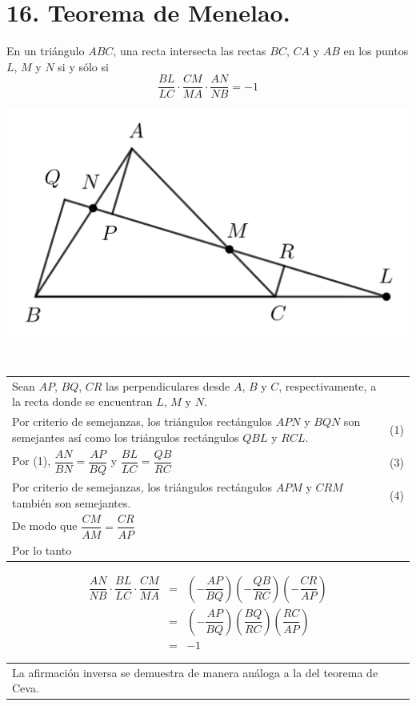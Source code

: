 \documentclass[12pt,a4paper, oneside]{book}
\begin{document}
\section{16. Teorema de Menelao.}
En un triángulo $ABC$, una recta intersecta las rectas $BC$, $CA$ y $AB$ en los puntos $L$, $M$ y $N$ si y sólo si
$$\dfrac{BL}{LC}\cdot\dfrac{CM}{MA}\cdot\dfrac{AN}{NB}=-1$$
\begin{center}
\includegraphics[scale=0.7]{Imagenes/Menelao1.png} 
\end{center}
\\
\begin{tabular}{p{15.9 cm} p{1cm}}
Sean $AP$, $BQ$, $CR$ las perpendiculares desde $A$, $B$ y $C$, respectivamente, a la recta donde se encuentran $L$, $M$ y $N$.
\\Por criterio de semejanzas, los triángulos rectángulos $APN$ y $BQN$ son semejantes así como los triángulos rectángulos $QBL$ y $RCL$. &(1)
\\Por (1), $\dfrac{AN}{BN}=\dfrac{AP}{BQ}$ y $\dfrac{BL}{LC}=\dfrac{QB}{RC}$ &(3)
\\Por criterio de semejanzas, los triángulos rectángulos $APM$ y $CRM$ también son semejantes.&(4)
\\ De modo que $\dfrac{CM}{AM}=\dfrac{CR}{AP}$
\\Por lo tanto
\end{tabular}
\begin{eqnarray*}
\dfrac{AN}{NB}\cdot \dfrac{BL}{LC}\cdot \dfrac{CM}{MA} &=& \left( - \dfrac{AP}{BQ}\right)  \left( -  \dfrac{QB}{RC} \right) \left( - \dfrac{CR}{AP}\right)
\\&=& \left(- \dfrac{AP}{BQ}\right) \left( \dfrac{BQ}{RC}\right) \left(\dfrac{RC}{AP} \right)
\\&=& -1
\end{eqnarray*}
\begin{tabular}{p{15.9 cm} p{1cm}}
La afirmación inversa se demuestra de manera análoga a la del teorema de Ceva.
\end{tabular}
\end{document}
